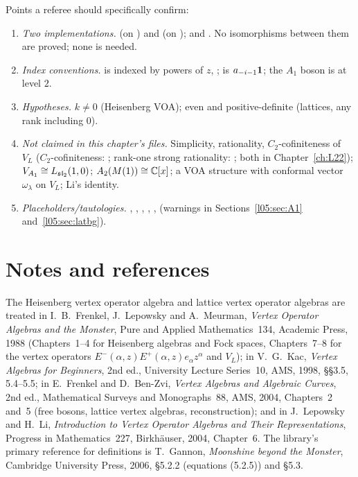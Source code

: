 Points a referee should specifically confirm:
\begin{enumerate}
\item \emph{Two implementations.}  (on ) and  (on );
   and . No isomorphisms between them are proved; none is needed.
\item \emph{Index conventions.}  is indexed by powers of $z$, ;  is
  $a_{-i-1}\mathbf{1}$; the $A_1$ boson is at level $2$.
\item \emph{Hypotheses.} $k\ne0$ (Heisenberg VOA); even and positive-definite (lattices, any rank including $0$).
\item \emph{Not claimed in this chapter's files.} Simplicity, rationality, $C_2$-cofiniteness of $V_L$
  ($C_2$-cofiniteness: ; rank-one strong rationality: ;
  both in Chapter~\ref{ch:L22}); $V_{A_1}\cong L_{\mathfrak{sl}_2}(1,0)$;
  $A_2(M(1))\cong{\mathbb{C}}[x]$; a VOA structure with conformal vector $\omega_\lambda$ on $V_L$; Li's identity.
\item \emph{Placeholders/tautologies.} , , ,
  , ,  (warnings in
  Sections~\ref{l05:sec:A1} and~\ref{l05:sec:latbg}).
\end{enumerate}

\section*{Notes and references}
\label{l05:sec:notes}

The Heisenberg vertex operator algebra and lattice vertex operator algebras are treated in I.~B.~Frenkel,
J.~Lepowsky and A.~Meurman, \emph{Vertex Operator Algebras and the Monster}, Pure and Applied Mathematics~134, Academic
Press, 1988 (Chapters~1--4 for Heisenberg algebras and Fock spaces, Chapters~7--8 for the vertex operators
$E^-(\alpha,z)E^+(\alpha,z)e_\alpha z^\alpha$ and $V_L$); in V.~G.~Kac, \emph{Vertex Algebras for Beginners}, 2nd ed., University
Lecture Series~10, AMS, 1998, \S\S3.5, 5.4--5.5; in E.~Frenkel and D.~Ben-Zvi, \emph{Vertex Algebras and Algebraic Curves},
2nd ed., Mathematical Surveys and Monographs~88, AMS, 2004, Chapters~2 and~5 (free bosons, lattice vertex algebras,
reconstruction); and in J.~Lepowsky and H.~Li, \emph{Introduction to Vertex Operator Algebras and Their Representations},
Progress in Mathematics~227, Birkh\"auser, 2004, Chapter~6. The library's primary reference for definitions is T.~Gannon,
\emph{Moonshine beyond the Monster}, Cambridge University Press, 2006, \S5.2.2 (equations (5.2.5)) and \S5.3.

